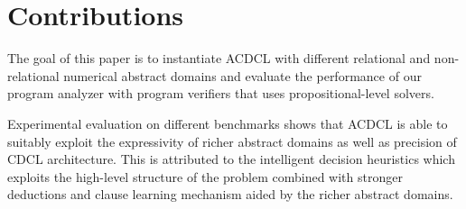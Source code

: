 \section{Contributions}
The goal of this paper is to instantiate ACDCL with 
different relational and non-relational numerical abstract 
domains and evaluate the performance of our program analyzer 
with program verifiers that uses propositional-level solvers. 

Experimental evaluation on different benchmarks shows that 
ACDCL is able to suitably exploit the expressivity of richer 
abstract domains as well as precision of CDCL architecture. 
This is attributed to the intelligent decision heuristics 
which exploits the high-level structure of the problem 
combined with stronger deductions and clause learning 
mechanism aided by the richer abstract domains.

